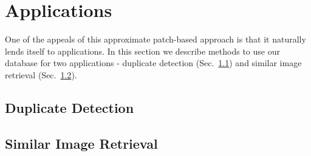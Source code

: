 \section{Applications}\label{sec:apps}

One of the appeals of this approximate patch-based approach
is that it naturally lends itself to applications. In this
section we describe methods to use our database for
two applications - duplicate detection (Sec.~\ref{ssec:dups})
and similar image retrieval (Sec.~\ref{ssec:retr}).

\subsection{Duplicate Detection}\label{ssec:dups}

\subsection{Similar Image Retrieval}\label{ssec:retr}
